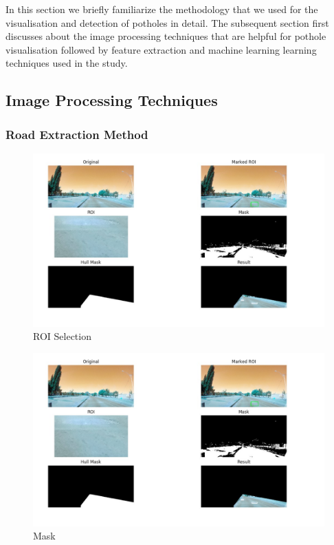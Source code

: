 \documentclass[journal]{IEEEtran}
\begin{document}
In this section we briefly familiarize the methodology that we used for the visualisation and detection of potholes in detail. The subsequent section first discusses about the image processing techniques that are helpful for pothole visualisation followed by feature extraction and machine learning learning techniques  used in the study.

\subsection{Image Processing Techniques}

\subsubsection{Road Extraction Method}

\begin{figure}[!h]
\begin{center}
\includegraphics[scale=0.25]{Images/roi.jpg}
\end{center}
\caption{ROI Selection}
\end{figure}


\begin{figure}[!h]
\begin{center}
\includegraphics[scale=0.25]{Images/roi.jpg}
\end{center}
\caption{Mask}
\end{figure}
\end{document}
